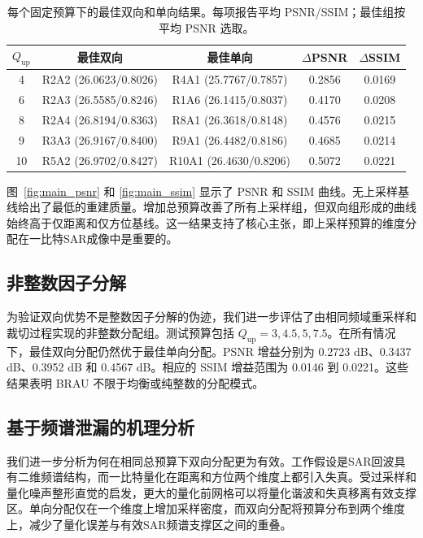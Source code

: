 \documentclass[conference]{IEEEtran}
\begin{document}
\begin{table}[t]
\caption{每个固定预算下的最佳双向和单向结果。每项报告平均 PSNR/SSIM；最佳组按平均 PSNR 选取。}
\begin{center}
\scriptsize
\setlength{\tabcolsep}{2pt}
\begin{tabular}{c c c c c}
\hline
$Q_{\mathrm{up}}$ & 最佳双向 & 最佳单向 & $\Delta$PSNR & $\Delta$SSIM \\
\hline
4  & R2A2 (26.0623/0.8026) & R4A1 (25.7767/0.7857)  & 0.2856 & 0.0169 \\
6  & R2A3 (26.5585/0.8246) & R1A6 (26.1415/0.8037)  & 0.4170 & 0.0208 \\
8  & R2A4 (26.8194/0.8363) & R8A1 (26.3618/0.8148)  & 0.4576 & 0.0215 \\
9  & R3A3 (26.9167/0.8400) & R9A1 (26.4482/0.8186)  & 0.4685 & 0.0214 \\
10 & R5A2 (26.9702/0.8427) & R10A1 (26.4630/0.8206) & 0.5072 & 0.0221 \\
\hline
\end{tabular}
\label{tab:main_gain}
\end{center}
\end{table}

图~\ref{fig:main_psnr} 和 \ref{fig:main_ssim} 显示了 PSNR 和 SSIM 曲线。无上采样基线给出了最低的重建质量。增加总预算改善了所有上采样组，但双向组形成的曲线始终高于仅距离和仅方位基线。这一结果支持了核心主张，即上采样预算的维度分配在一比特SAR成像中是重要的。

\subsection{非整数因子分解}

为验证双向优势不是整数因子分解的伪迹，我们进一步评估了由相同频域重采样和裁切过程实现的非整数分配组。测试预算包括 $Q_{\mathrm{up}}=3,4.5,5,7.5$。在所有情况下，最佳双向分配仍然优于最佳单向分配。PSNR 增益分别为 0.2723 dB、0.3437 dB、0.3952 dB 和 0.4567 dB。相应的 SSIM 增益范围为 0.0146 到 0.0221。这些结果表明 BRAU 不限于均衡或纯整数的分配模式。

\subsection{基于频谱泄漏的机理分析}

我们进一步分析为何在相同总预算下双向分配更为有效。工作假设是SAR回波具有二维频谱结构，而一比特量化在距离和方位两个维度上都引入失真。受过采样和量化噪声整形直觉的启发，更大的量化前网格可以将量化谐波和失真移离有效支撑区。单向分配仅在一个维度上增加采样密度，而双向分配将预算分布到两个维度上，减少了量化误差与有效SAR频谱支撑区之间的重叠。
\end{document}
